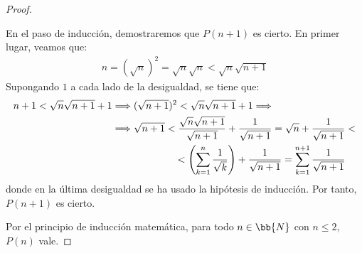 \begin{ejercicio}
\begin{proof}
\begin{itemize}
        En el paso de inducción, demostraremos que $P(n+1)$ es cierto. En primer lugar, veamos que:
        \begin{align*}
            n = (\sqrt{n})^2 = \sqrt{n}\sqrt{n} < \sqrt{n}\sqrt{n+1}
        \end{align*}
        Supongando $1$ a cada lado de la desigualdad, se tiene que:
        \begin{align*}
            n+1 < \sqrt{n}\sqrt{n+1} +1 
            &\Longrightarrow (\sqrt{n+1})^2 < \sqrt{n}\sqrt{n+1}+1
            \Longrightarrow\\ &\Longrightarrow \sqrt{n+1} < \dfrac{\sqrt{n}\sqrt{n+1}}{\sqrt{n+1}}+\dfrac{1}{\sqrt{n+1}}
                           =\sqrt{n}+\dfrac{1}{\sqrt{n+1}}<\\
                           &\hspace{2.22cm} <\left( \sum_{k=1}^n \dfrac{1}{\sqrt{k}}\right)+\dfrac{1}{\sqrt{n+1}}
                           =\sum_{k=1}^{n+1} \dfrac{1}{\sqrt{n+1}}
        \end{align*}
        donde en la última desigualdad se ha usado la hipótesis de inducción. Por tanto, $P(n+1)$ es cierto.
    \end{itemize}
    Por el principio de inducción matemática, para todo $n \in \bb{N}$ con $n \leq 2$, $P(n)$ vale.
\end{proof}
\end{ejercicio}
